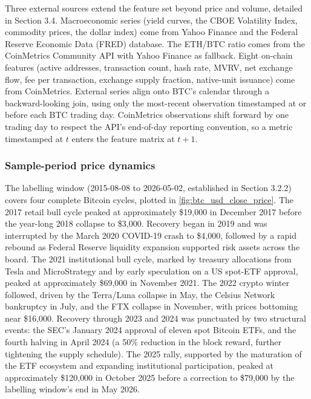 Three external sources extend the feature set beyond price and volume, detailed in Section 3.4. Macroeconomic series (yield curves, the CBOE Volatility Index, commodity prices, the dollar index) come from Yahoo Finance and the Federal Reserve Economic Data (FRED) database. The ETH/BTC ratio comes from the CoinMetrics Community API with Yahoo Finance as fallback. Eight on-chain features (active addresses, transaction count, hash rate, MVRV, net exchange flow, fee per transaction, exchange supply fraction, native-unit issuance) come from CoinMetrics. External series align onto BTC's calendar through a backward-looking join, using only the most-recent observation timestamped at or before each BTC trading day. CoinMetrics observations shift forward by one trading day to respect the API's end-of-day reporting convention, so a metric timestamped at $t$ enters the feature matrix at $t+1$.


\subsubsection{Sample-period price dynamics}\label{subsubsec:price_dynamics}

The labelling window (2015-08-08 to 2026-05-02, established in Section 3.2.2) covers four complete Bitcoin cycles, plotted in \autoref{fig:btc_usd_close_price}. The 2017 retail bull cycle peaked at approximately \$19{,}000 in December 2017 before the year-long 2018 collapse to \$3{,}000. Recovery began in 2019 and was interrupted by the March 2020 COVID-19 crash to \$4{,}000, followed by a rapid rebound as Federal Reserve liquidity expansion supported risk assets across the board. The 2021 institutional bull cycle, marked by treasury allocations from Tesla and MicroStrategy and by early speculation on a US spot-ETF approval, peaked at approximately \$69{,}000 in November 2021. The 2022 crypto winter followed, driven by the Terra/Luna collapse in May, the Celsius Network bankruptcy in July, and the FTX collapse in November, with prices bottoming near \$16{,}000. Recovery through 2023 and 2024 was punctuated by two structural events: the SEC's January 2024 approval of eleven spot Bitcoin ETFs, and the fourth halving in April 2024 (a 50\% reduction in the block reward, further tightening the supply schedule). The 2025 rally, supported by the maturation of the ETF ecosystem and expanding institutional participation, peaked at approximately \$120{,}000 in October 2025 before a correction to \$79{,}000 by the labelling window's end in May 2026.

